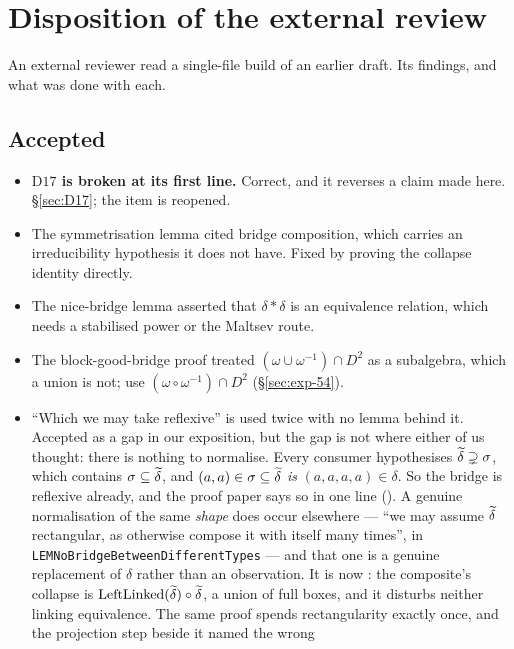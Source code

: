 \section{Disposition of the external review}\label{sec:review}

An external reviewer read a single-file build of an earlier draft. Its
findings, and what was done with each.

\subsection{Accepted}\label{sec:review-accepted}

\begin{itemize}\tightlist
\item \textbf{$\mathrm D17$ is broken at its first line.} Correct, and it
  reverses a claim made here. \S\ref{sec:D17}; the item is reopened.
\item The symmetrisation lemma cited bridge composition, which carries an
  irreducibility hypothesis it does not have. Fixed by proving the collapse
  identity directly.
\item The nice-bridge lemma asserted that $\delta\ast\delta$ is an equivalence
  relation, which needs a stabilised power or the Maltsev route.
\item The block-good-bridge proof treated $(\omega\cup\omega^{-1})\cap D^{2}$ as
  a subalgebra, which a union is not; use $(\omega\circ\omega^{-1})\cap D^{2}$
  (\S\ref{sec:exp-54}).
\item ``Which we may take reflexive'' is used twice with no lemma behind it.
  Accepted as a gap in our exposition, but the gap is not where either of us
  thought: there is nothing to normalise. Every consumer hypothesises
  $\widetilde{\delta}\supsetneq\sigma$, which contains $\sigma\subseteq\widetilde{\delta}$,
  and $(a,a)\in\sigma\subseteq\widetilde{\delta}$ \emph{is} $(a,a,a,a)\in\delta$. So
  the bridge is reflexive already, and the proof paper says so in one line
  (). A genuine normalisation of the same
  \emph{shape} does occur elsewhere --- ``we may assume $\widetilde{\delta}$
  rectangular, as otherwise compose it with itself many times'', in
  \texttt{LEMNoBridge\brk Between\brk DifferentTypes} --- and that one is a
  genuine replacement of $\delta$ rather than an observation. It is now
  : the composite's collapse is
  $\operatorname{LeftLinked}(\widetilde{\delta})\circ\widetilde{\delta}$, a union of full boxes, and it
  disturbs neither linking equivalence. The same proof spends rectangularity
  exactly once, and the projection step beside it named the wrong

\end{itemize}
